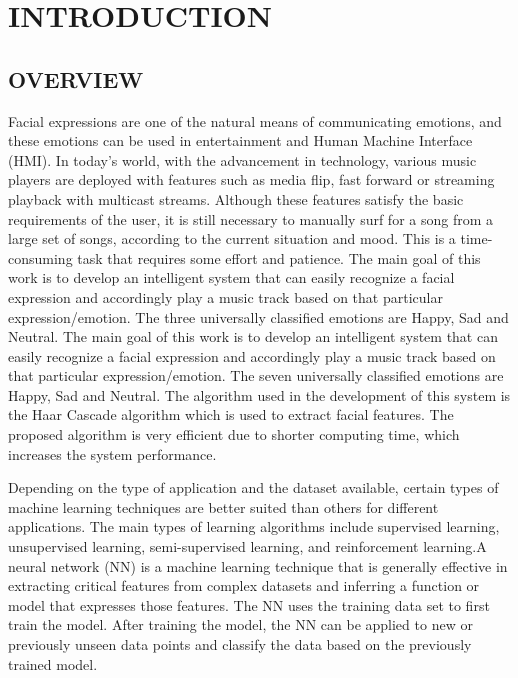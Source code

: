 \documentclass[12pt]{report}
\begin{document}
\listoffigures
\thispagestyle{empty}

\clearpage
{}

\fancyhead[R]{\thepage}

\centering
\section{INTRODUCTION}
\raggedright
\subsection{OVERVIEW}

\justifying
\setlength{\parindent}{4em}
\setlength{\parskip}{0.5em}
\renewcommand{\baselinestretch}{1.5}

\normalsize
\hspace{1.7cm}
Facial expressions are one of the natural means of communicating emotions, and 
these emotions can be used in entertainment and Human Machine Interface (HMI). In 
today's world, with the advancement in technology, various music players are deployed with 
features such as media flip, fast forward or streaming playback with multicast streams. 
Although these features satisfy the basic requirements of the user, it is still necessary to 
manually surf for a song from a large set of songs, according to the current situation and 
mood. This is a time-consuming task that requires some effort and patience. The main goal 
of this work is to develop an intelligent system that can easily recognize a facial expression 
and accordingly play a music track based on that particular expression/emotion. The three 
universally classified emotions are Happy, Sad and Neutral. The main goal of this work is 
to develop an intelligent system that can easily recognize a facial expression and 
accordingly play a music track based on that particular expression/emotion. The seven 
universally classified emotions are Happy, Sad and Neutral. The algorithm used in the 
development of this system is the Haar Cascade algorithm which is used to extract facial 
features. The proposed algorithm is very efficient due to shorter computing time, which 
increases the system performance.


Depending on the type of 
application and the dataset available, certain types of machine learning techniques are better
suited than others for different applications. The main types of learning algorithms include 
supervised learning, unsupervised learning, semi-supervised learning, and reinforcement 
learning.A neural network (NN) is a machine learning technique that is generally effective 
in extracting critical features from complex datasets and inferring a function or model that 
expresses those features. The NN uses the training data set to first train the model. After 
training the model, the NN can be applied to new or previously unseen data points and 
classify the data based on the previously trained model.
\end{document}
